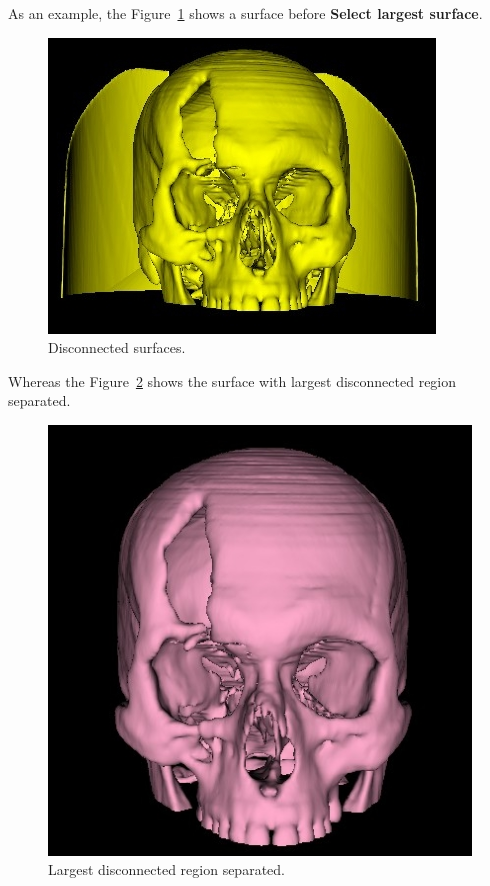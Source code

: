 As an example, the Figure~\ref{fig:extract_most_region_1} shows a surface before \textbf{Select largest surface}.

\begin{figure}[!htb]
\centering
\includegraphics[scale=0.3]{../user_guide_figures/invesalius_screen/surface_extract_most_region_1.jpg}
\caption{Disconnected surfaces.}
\label{fig:extract_most_region_1}
\end{figure}

Whereas the Figure~\ref{fig:extract_most_region2} shows the surface with largest disconnected region separated.

\begin{figure}[!htb]
\centering
\includegraphics[scale=0.3]{../user_guide_figures/invesalius_screen/surface_extract_most_region2.jpg}
\caption{Largest disconnected region separated.}
\label{fig:extract_most_region2}
\end{figure}


